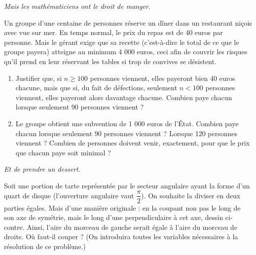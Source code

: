 \begin{enumerate}
\setcounter{enumi}{4}

\item \textit{Mais les mathématiciens ont le droit de manger.} 

Un groupe d'une centaine de personnes réserve un dîner dans un restaurant niçois avec vue sur mer. En temps normal, le prix du repas est de 40 euros par personne. Mais le gérant exige que sa recette (c'est-à-dire le total de ce que le groupe payera) atteigne au minimum 4 000 euros, ceci afin de couvrir les risques qu'il prend en leur réservant les tables si trop de convives se désistent.

\begin{enumerate}
\item Justifier que, si \( n \geqslant 100 \) personnes viennent, elles payeront bien 40 euros chacune, mais que si, du fait de défections, seulement \( n < 100 \) personnes viennent, elles payeront alors davantage chacune. Combien paye chacun lorsque seulement 90 personnes viennent ?

\item Le groupe obtient une subvention de 1 000 euros de l'État. Combien paye chacun lorsque seulement 90 personnes viennent ? Lorsque 120 personnes viennent ? Combien de personnes doivent venir, exactement, pour que le prix que chacun paye soit minimal ?
\end{enumerate}

\noindent\begin{minipage}{.65\linewidth}
\item \textit{Et de prendre un dessert.} 

Soit une portion de tarte représentée par le secteur angulaire ayant la forme d’un quart de disque (l’ouverture angulaire vaut \( \dfrac{\pi}{2} \)). On souhaite la diviser en deux parties égales. Mais d’une manière originale : en la coupant non pas le long de son axe de symétrie, mais le long d’une perpendiculaire à cet axe, dessin ci-contre. Ainsi, l’aire du morceau de gauche serait égale à l’aire du morceau de droite. Où faut-il couper ? (On introduira toutes les variables nécessaires à la résolution de ce problème.)
\end{minipage}
\hfill\begin{minipage}{.35\linewidth}
\begin{center}
\end{center}
\end{minipage}
\end{enumerate}
